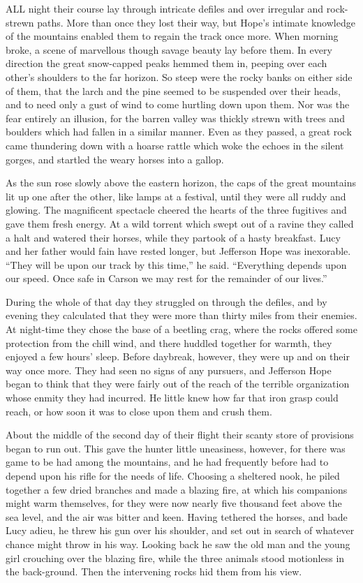 \documentclass[12pt]{book}
\begin{document}
ALL night their course lay through intricate defiles and over irregular and rock-strewn paths. More than once they lost their way, but Hope’s intimate knowledge of the mountains enabled them to regain the track once more. When morning broke, a scene of marvellous though savage beauty lay before them. In every direction the great snow-capped peaks hemmed them in, peeping over each other’s shoulders to the far horizon. So steep were the rocky banks on either side of them, that the larch and the pine seemed to be suspended over their heads, and to need only a gust of wind to come hurtling down upon them. Nor was the fear entirely an illusion, for the barren valley was thickly strewn with trees and boulders which had fallen in a similar manner. Even as they passed, a great rock came thundering down with a hoarse rattle which woke the echoes in the silent gorges, and startled the weary horses into a gallop. 

As the sun rose slowly above the eastern horizon, the caps of the great mountains lit up one after the other, like lamps at a festival, until they were all ruddy and glowing. The magnificent spectacle cheered the hearts of the three fugitives and gave them fresh energy. At a wild torrent which swept out of a ravine they called a halt and watered their horses, while they partook of a hasty breakfast. Lucy and her father would fain have rested longer, but Jefferson Hope was inexorable. “They will be upon our track by this time,” he said. “Everything depends upon our speed. Once safe in Carson we may rest for the remainder of our lives.” 

During the whole of that day they struggled on through the defiles, and by evening they calculated that they were more than thirty miles from their enemies. At night-time they chose the base of a beetling crag, where the rocks offered some protection from the chill wind, and there huddled together for warmth, they enjoyed a few hours’ sleep. Before daybreak, however, they were up and on their way once more. They had seen no signs of any pursuers, and Jefferson Hope began to think that they were fairly out of the reach of the terrible organization whose enmity they had incurred. He little knew how far that iron grasp could reach, or how soon it was to close upon them and crush them. 

About the middle of the second day of their flight their scanty store of provisions began to run out. This gave the hunter little uneasiness, however, for there was game to be had among the mountains, and he had frequently before had to depend upon his rifle for the needs of life. Choosing a sheltered nook, he piled together a few dried branches and made a blazing fire, at which his companions might warm themselves, for they were now nearly five thousand feet above the sea level, and the air was bitter and keen. Having tethered the horses, and bade Lucy adieu, he threw his gun over his shoulder, and set out in search of whatever chance might throw in his way. Looking back he saw the old man and the young girl crouching over the blazing fire, while the three animals stood motionless in the back-ground. Then the intervening rocks hid them from his view. 
\end{document}

